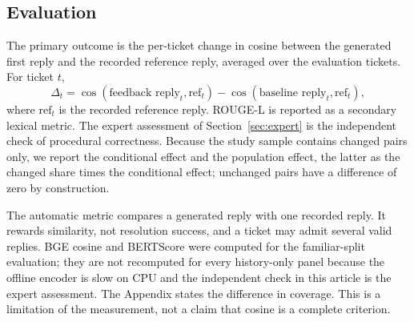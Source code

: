 \subsection{Evaluation}
The primary outcome is the per-ticket change in cosine between the generated first
reply and the recorded reference reply, averaged over the evaluation tickets. For
ticket $t$,
\begin{equation}
\Delta_t = \cos(\text{feedback reply}_t,\text{ref}_t)
           - \cos(\text{baseline reply}_t,\text{ref}_t),
\label{eq:delta}
\end{equation}
where $\text{ref}_t$ is the recorded reference reply. ROUGE-L \cite{b27} is
reported as a secondary lexical metric. The expert assessment of
Section~\ref{sec:expert} is the independent check of procedural correctness.
Because the study sample contains changed pairs only, we report the conditional
effect and the population effect, the latter as the changed share times the
conditional effect; unchanged pairs have a difference of zero by construction.

The automatic metric compares a generated reply with one recorded reply. It
rewards similarity, not resolution success, and a ticket may admit several valid
replies. BGE cosine \cite{b25} and BERTScore \cite{b26} were computed for the
familiar-split evaluation; they are not recomputed for every history-only panel because the
offline encoder is slow on CPU and the independent check in this article is the
expert assessment. The Appendix states the difference in coverage. This is a
limitation of the measurement, not a claim that cosine is a complete criterion.
